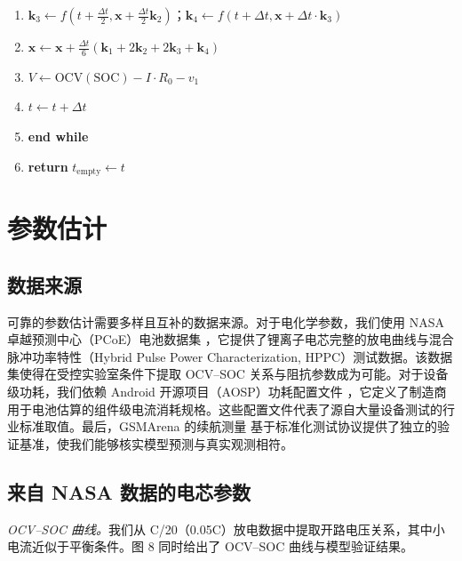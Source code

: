 \documentclass[11pt,a4paper]{ctexart}
\begin{document}
\begin{center}
{\begin{minipage}{0.94\linewidth}
\begin{enumerate}[leftmargin=2.6em,itemsep=0pt,topsep=0pt,parsep=0pt,label=\arabic*:]
\item[12:] \hspace{1em}$\mathbf{k}_3 \leftarrow f(t+\frac{\Delta t}{2}, \mathbf{x}+\frac{\Delta t}{2}\mathbf{k}_2)$；$\mathbf{k}_4 \leftarrow f(t+\Delta t, \mathbf{x}+\Delta t\cdot\mathbf{k}_3)$
\item[13:] \hspace{1em}$\mathbf{x} \leftarrow \mathbf{x} + \frac{\Delta t}{6}(\mathbf{k}_1+2\mathbf{k}_2+2\mathbf{k}_3+\mathbf{k}_4)$
\item[14:] \hspace{1em}$V \leftarrow \mathrm{OCV}(\mathrm{SOC}) - I\cdot R_0 - v_1$
\item[15:] \hspace{1em}$t \leftarrow t+\Delta t$
\item[16:] \textbf{end while}
\item[17:] \textbf{return} $t_{\mathrm{empty}} \leftarrow t$
\end{enumerate}
\end{minipage}}
\end{center}

\section{参数估计}

\subsection{数据来源}

可靠的参数估计需要多样且互补的数据来源。对于电化学参数，我们使用 NASA 卓越预测中心（PCoE）电池数据集 \cite{ref4}，它提供了锂离子电芯完整的放电曲线与混合脉冲功率特性（Hybrid Pulse Power Characterization, HPPC）测试数据。该数据集使得在受控实验室条件下提取 OCV--SOC 关系与阻抗参数成为可能。对于设备级功耗，我们依赖 Android 开源项目（AOSP）功耗配置文件 \cite{ref5}，它定义了制造商用于电池估算的组件级电流消耗规格。这些配置文件代表了源自大量设备测试的行业标准取值。最后，GSMArena 的续航测量 \cite{ref6} 基于标准化测试协议提供了独立的验证基准，使我们能够核实模型预测与真实观测相符。

\subsection{来自 NASA 数据的电芯参数}

\textit{OCV--SOC 曲线。}我们从 C/20（0.05C）放电数据中提取开路电压关系，其中小电流近似于平衡条件。图 8 同时给出了 OCV--SOC 曲线与模型验证结果。
\end{document}
